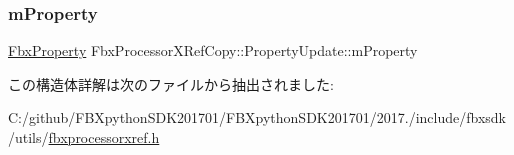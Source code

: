 \subsubsection{\texorpdfstring{m\+Property}{mProperty}}
{\footnotesize\ttfamily \hyperlink{class_fbx_property}{Fbx\+Property} Fbx\+Processor\+X\+Ref\+Copy\+::\+Property\+Update\+::m\+Property}



この構造体詳解は次のファイルから抽出されました\+:\begin{DoxyCompactItemize}
\item 
C\+:/github/\+F\+B\+Xpython\+S\+D\+K201701/\+F\+B\+Xpython\+S\+D\+K201701/2017./include/fbxsdk/utils/\hyperlink{fbxprocessorxref_8h}{fbxprocessorxref.\+h}\end{DoxyCompactItemize}
